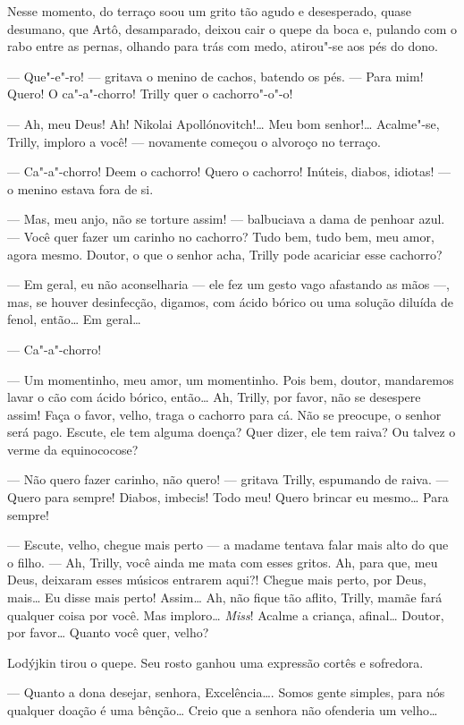 Nesse momento, do terraço soou um grito tão agudo e desesperado, quase
desumano, que Artô, desamparado, deixou cair o quepe da boca e, pulando
com o rabo entre as pernas, olhando para trás com medo, atirou"-se aos
pés do dono.

--- Que"-e"-ro! --- gritava o menino de cachos, batendo os pés. --- Para
mim! Quero! O ca"-a"-chorro! Trilly
quer o cachorro"-o"-o!

--- Ah, meu Deus! Ah! Nikolai Apollónovitch!\ldots{} Meu bom senhor!\ldots{}
Acalme"-se, Trilly, imploro a você! --- novamente começou o alvoroço no
terraço.

--- Ca"-a"-chorro! Deem o cachorro! Quero o cachorro! Inúteis, diabos,
idiotas! --- o menino estava fora de si.

--- Mas, meu anjo, não se torture assim! --- balbuciava a dama de
penhoar azul. --- Você quer fazer um carinho no cachorro? Tudo bem, tudo
bem, meu amor, agora mesmo. Doutor, o que o senhor acha, Trilly pode
acariciar esse cachorro?

--- Em geral, eu não aconselharia --- ele fez um gesto vago afastando as
mãos ---, mas, se houver desinfecção, digamos, com ácido bórico ou uma
solução diluída de fenol, então\ldots{} Em geral\ldots{}

--- Ca"-a"-chorro!

--- Um momentinho, meu amor, um momentinho. Pois bem, doutor, mandaremos
lavar o cão com ácido bórico, então\ldots{} Ah, Trilly, por favor, não se
desespere assim! Faça o favor, velho, traga o cachorro para cá. Não se
preocupe, o senhor será pago. Escute, ele tem alguma doença? Quer dizer,
ele tem raiva? Ou talvez o verme da equinococose?

--- Não quero fazer carinho, não quero! --- gritava Trilly, espumando de
raiva. --- Quero para sempre! Diabos, imbecis! Todo meu! Quero brincar
eu mesmo\ldots{} Para sempre!

--- Escute, velho, chegue mais perto --- a madame tentava falar mais
alto do que o filho. --- Ah, Trilly, você ainda me mata com esses
gritos. Ah, para que, meu Deus, deixaram esses músicos entrarem aqui?!
Chegue mais perto, por Deus, mais\ldots{} Eu disse mais perto! Assim\ldots{} Ah,
não fique tão aflito, Trilly, mamãe fará qualquer coisa por você. Mas
imploro\ldots{} \emph{Miss}! Acalme a criança, afinal\ldots{} Doutor, por favor\ldots{}
Quanto você quer, velho?

Lodýjkin tirou o quepe. Seu rosto ganhou uma expressão cortês e
sofredora.

--- Quanto a dona desejar, senhora, Excelência\ldots{}. Somos gente simples,
para nós qualquer doação é uma bênção\ldots{} Creio que a senhora não
ofenderia um velho\ldots{}

